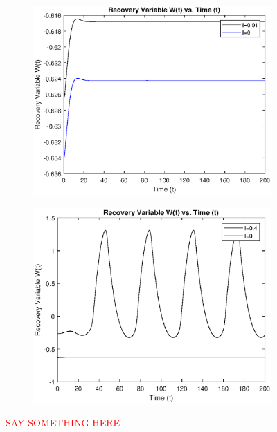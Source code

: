 \documentclass{book}
\theoremstyle{definition}
\begin{document}
\begin{figure}[!htb]
	\centering
	\begin{subfigure}{0.5\textwidth}
		\centering
		\includegraphics[scale=0.6]{FHN_lab/W_t_2.eps}
	\end{subfigure}%
	\begin{subfigure}{0.5\textwidth}
		\centering
		\includegraphics[scale=0.6]{FHN_lab/W_t_3.eps}
		
	\end{subfigure}%
	\caption{\textcolor{red}{SAY SOMETHING HERE}}
	\label{Fig:4}
\end{figure}
\end{document}
